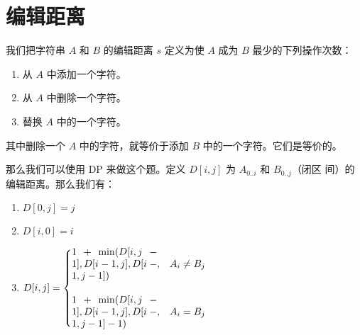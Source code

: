 \section{编辑距离}
我们把字符串 $A$ 和 $B$ 的编辑距离 $s$ 定义为使 $A$ 成为 $B$ 最少的下列操作次数：
\begin{enumerate}
    \item 从 $A$ 中添加一个字符。
    \item 从 $A$ 中删除一个字符。
    \item 替换 $A$ 中的一个字符。
\end{enumerate}

其中删除一个 $A$ 中的字符，就等价于添加 $B$ 中的一个字符。它们是等价的。

那么我们可以使用 DP 来做这个题。定义 $D[i, j]$ 为 $A_{0..i}$ 和 $B_{0..j}$（闭区
间）的编辑距离。那么我们有：

\begin{enumerate}
    \item $D[0, j] = j$
    \item $D[i, 0] = i$
    \item $D[i, j] = \begin{cases}
            \parbox{0.25\textwidth}{$1 + \min(D[i, j-1], D[i-1, j],
                D[i-1,j-1])$}, & A_i \ne B_j \\
                \\
            \parbox{0.25\textwidth}{$1 + \min(D[i, j-1], D[i-1, j],
                D[i-1,j-1] - 1)$}, & A_i = B_j \\
        \end{cases}$
\end{enumerate}

